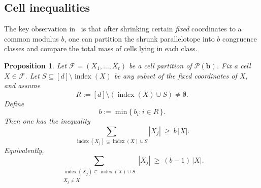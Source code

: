 \documentclass[11pt,reqno]{amsart}
\newtheorem{proposition}[theorem]{Proposition}
\theoremstyle{definition}
\DeclareMathOperator{\ind}{index}
\begin{document}
\subsection{Cell inequalities}

The key observation in~\cite{BFF} is that after shrinking certain \emph{fixed} coordinates to a common modulus \(b\),
one can partition the shrunk parallelotope into \(b\) congruence classes and compare the total mass of cells lying in each class.

\begin{proposition}\label{prop:gen-cell-ineq}
Let \(\mathcal{F}=(X_1,\dots,X_t)\) be a cell partition of \(\mathcal{P}(\mathbf{b})\).
Fix a cell \(X\in\mathcal{F}\).
Let \(S\subseteq [d]\setminus \ind(X)\) be any subset of the \emph{fixed} coordinates of \(X\), and assume
\[
  R:= [d]\setminus (\ind(X) \cup S)\neq \emptyset.
\]
Define
\[
  b:=\min\{\,b_i : i\in R\,\}.
\]
Then one has the inequality
\begin{equation}\label{eq:gen-ineq-including}
  \sum_{\ind(X_j)\subseteq \ind(X) \cup S} |X_j|\ \ge\ b\,|X|.
\end{equation}
Equivalently,
\begin{equation}\label{eq:gen-ineq-excluding}
  \sum_{\substack{\ind(X_j)\subseteq \ind(X)\cup S\\ X_j\neq X}} |X_j|\ \ge\ (b-1)\,|X|.
\end{equation}
\end{proposition}
\end{document}
